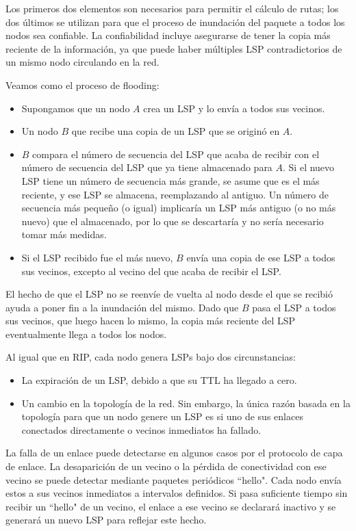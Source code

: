 Los primeros dos elementos son necesarios para permitir el cálculo de rutas; los dos últimos se utilizan para que el proceso de inundación del paquete a todos los nodos sea confiable. La confiabilidad incluye asegurarse de tener la copia más reciente de la información, ya que puede haber múltiples LSP contradictorios de un mismo nodo circulando en la red.

Veamos como el proceso de flooding: 
\begin{itemize}
  \item Supongamos que un nodo \(A\) crea un LSP y lo envía a todos sus vecinos.
  \item Un nodo \(B\) que recibe una copia de un LSP que se originó en \(A\).
  \item \(B\) compara el número de secuencia del LSP que acaba de recibir con el número de secuencia del LSP que ya tiene almacenado para \(A\). Si el nuevo LSP tiene un número de secuencia más grande, se asume que es el más reciente, y ese LSP se almacena, reemplazando al antiguo. Un número de secuencia más pequeño (o igual) implicaría un LSP más antiguo (o no más nuevo) que el almacenado, por lo que se descartaría y no sería necesario tomar más medidas.
  \item Si el LSP recibido fue el más nuevo, \(B\) envía una copia de ese LSP a todos sus vecinos, excepto al vecino del que acaba de recibir el LSP.
\end{itemize}

El hecho de que el LSP no se reenvíe de vuelta al nodo desde el que se recibió ayuda a poner fin a la inundación del mismo. Dado que \(B\) pasa el LSP a todos sus vecinos, que luego hacen lo mismo, la copia más reciente del LSP eventualmente llega a todos los nodos.

Al igual que en RIP, cada nodo genera LSPs bajo dos circunstancias:
\begin{itemize}
  \item La expiración de un LSP, debido a que su TTL ha llegado a cero.
  \item Un cambio en la topología de la red. Sin embargo, la única razón basada en la topología para que un nodo genere un LSP es si uno de sus enlaces conectados directamente o vecinos inmediatos ha fallado.
\end{itemize}

La falla de un enlace puede detectarse en algunos casos por el protocolo de capa de enlace. La desaparición de un vecino o la pérdida de conectividad con ese vecino se puede detectar mediante paquetes periódicos ``hello". Cada nodo envía estos a sus vecinos inmediatos a intervalos definidos. Si pasa suficiente tiempo sin recibir un ``hello" de un vecino, el enlace a ese vecino se declarará inactivo y se generará un nuevo LSP para reflejar este hecho.

